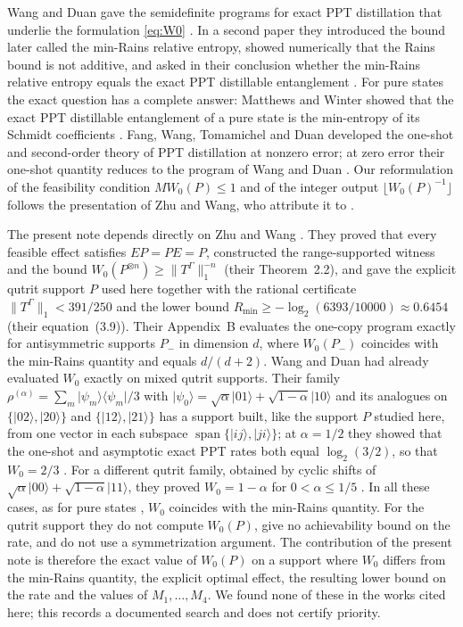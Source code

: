 \documentclass[11pt,a4paper]{article}
\theoremstyle{definition}
\theoremstyle{plain}
\newcommand{\ket}[1]{\lvert#1\rangle}
\newcommand{\bra}[1]{\langle#1\rvert}
\newcommand{\norm}[1]{\lVert#1\rVert}
\begin{document}
Wang and Duan gave the semidefinite programs for exact PPT distillation that
underlie the formulation \eqref{eq:W0} \cite{WangDuan2016}. In a second paper
they introduced the bound later called the min-Rains relative entropy, showed
numerically that the Rains bound is not additive, and asked in their
conclusion whether the min-Rains relative entropy equals the exact PPT
distillable entanglement \cite{WangDuan2017}. For pure states the exact
question has a complete answer: Matthews and Winter showed that the exact PPT
distillable entanglement of a pure state is the min-entropy of its Schmidt
coefficients \cite[Prop.~4]{MatthewsWinter2008}. Fang, Wang, Tomamichel and
Duan developed the one-shot and second-order theory of PPT distillation at
nonzero error; at zero error their one-shot quantity reduces to the program of
Wang and Duan \cite{Fang2019,WangDuan2016}. Our
reformulation of the feasibility condition $M W_0(P)\le1$ and of the integer
output $\lfloor W_0(P)^{-1}\rfloor$ follows the presentation of Zhu and Wang,
who attribute it to \cite{WangDuan2016}.

The present note depends directly on Zhu and Wang \cite{ZhuWang2026}. They
proved that every feasible effect satisfies $EP=PE=P$, constructed the
range-supported witness and the bound
$W_0(P^{\otimes n})\ge\norm{T^\Gamma}_1^{-n}$ (their Theorem~2.2), and gave the
explicit qutrit support $P$ used here together with the rational certificate
$\norm{T^\Gamma}_1<391/250$ and the lower bound
$R_{\min}\ge-\log_2(6393/10000)\approx0.6454$ (their equation~(3.9)). Their
Appendix~B evaluates the one-copy program exactly for antisymmetric supports
$P_-$ in dimension $d$, where $W_0(P_-)$ coincides with the min-Rains quantity
and equals $d/(d+2)$. Wang and Duan had already evaluated $W_0$ exactly on
mixed qutrit supports. Their family
$\rho^{(\alpha)}=\sum_{m}\ket{\psi_m}\bra{\psi_m}/3$ with
$\ket{\psi_0}=\sqrt\alpha\ket{01}+\sqrt{1-\alpha}\ket{10}$ and its analogues on
$\{\ket{02},\ket{20}\}$ and $\{\ket{12},\ket{21}\}$ has a support built, like
the support $P$ studied here, from one vector in each subspace
$\operatorname{span}\{\ket{ij},\ket{ji}\}$; at $\alpha=1/2$ they showed that
the one-shot and asymptotic exact PPT rates both equal $\log_2(3/2)$, so that
$W_0=2/3$ \cite[Prop.~5 and the closing discussion]{WangDuan2016}. For a
different qutrit family, obtained by cyclic shifts of
$\sqrt\alpha\ket{00}+\sqrt{1-\alpha}\ket{11}$, they proved $W_0=1-\alpha$ for
$0<\alpha\le1/5$ \cite[Prop.~4 and Example]{WangDuan2017}. In all these cases,
as for pure states \cite[Prop.~4]{MatthewsWinter2008}, $W_0$ coincides with the
min-Rains quantity.
For the qutrit support they do not compute $W_0(P)$, give no achievability
bound on the rate, and do not use a symmetrization argument. The contribution
of the present note is therefore the exact value of $W_0(P)$ on a support where
$W_0$ differs from the min-Rains quantity, the explicit optimal effect, the
resulting lower bound on the rate and the values of $M_1,\dots,M_4$. We found
none of these in the works cited here; this records a documented search and
does not certify priority.
\end{document}
